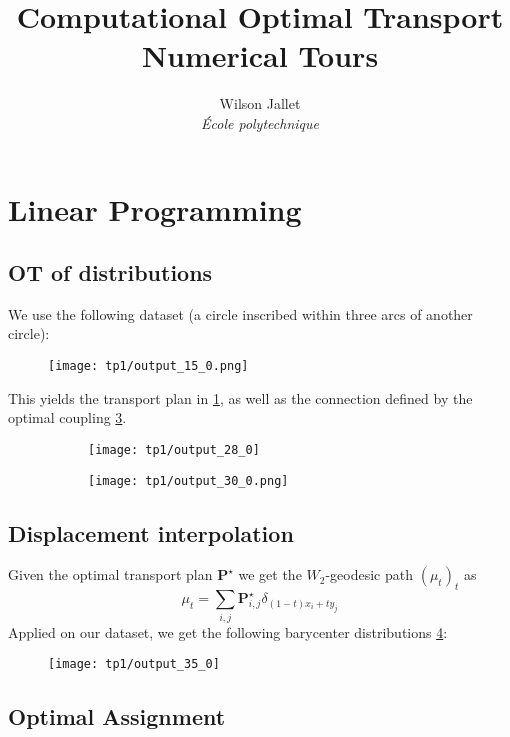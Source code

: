 \documentclass{article}
\author{
	Wilson Jallet\\
	\textit{École polytechnique}
}
\title{
	{\Large\sffamily Computational Optimal Transport}\\
	Numerical Tours}
\newcommand{\bfP}{\mathbf{P}}
\numberwithin{equation}{section}
\theoremstyle{definition}
\begin{document}
\maketitle

\section{Linear Programming}
\subsection{OT of distributions}

We use the following dataset (a circle inscribed within three arcs of another circle):
\begin{figure}[!h]
	\centering
	\texttt{[image: tp1/output\_15\_0.png]}
	\caption{}
\end{figure}

This yields the transport plan in \cref{fig:output280}, as well as the connection defined by the optimal coupling \cref{fig:output300}.
\begin{figure}[!h]
	\centering
	\begin{subfigure}{.44\linewidth}
		\centering
		\texttt{[image: tp1/output\_28\_0]}
		\caption{}
		\label{fig:output280}
	\end{subfigure}
	\begin{subfigure}{.44\linewidth}
		\centering
		\texttt{[image: tp1/output\_30\_0.png]}
		\caption{}\label{fig:output300}
	\end{subfigure}
	\caption{}
\end{figure}


\subsection{Displacement interpolation}

Given the optimal transport plan $\bfP^\star$ we get the $W_2$-geodesic path $(\mu_t)_t$ as
\[
	\mu_t = \sum_{i,j} \bfP^\star_{i,j} \delta_{(1-t)x_i + ty_j}
\]
Applied on our dataset, we get the following barycenter distributions \cref{fig:output350}:
\begin{figure}[h!]
	\centering
	\texttt{[image: tp1/output\_35\_0]}
	\caption{}
	\label{fig:output350}
\end{figure}


\subsection{Optimal Assignment}
\end{document}
